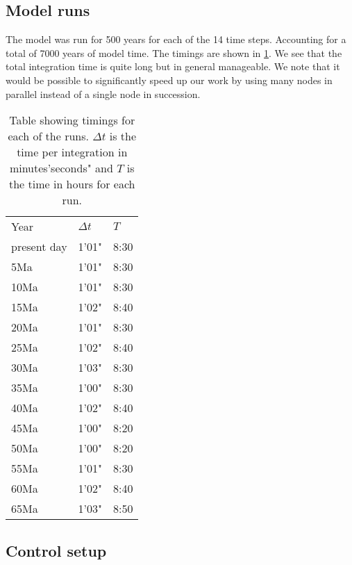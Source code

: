 \subsection{Model runs}
The model was run for 500 years for each of the 14 time steps. Accounting for a total of 7000 years of model time. The timings are shown in \cref{table:masteps}. We see that the total integration time is quite long but in general manageable. We note that it would be possible to significantly speed up our work by using many nodes in parallel instead of a single node in succession.
\begin{table}[H]
	\centering
	\begin{tabular}{lll}
Year & $\Delta t$ & $T$ \\
present day & 1'01" & 8:30 \\
5Ma& 1'01" & 8:30 \\
10Ma & 1'01" & 8:30 \\
15Ma & 1'02" & 8:40 \\
20Ma & 1'01" & 8:30 \\
25Ma & 1'02" & 8:40 \\
30Ma & 1'03" & 8:30 \\
35Ma & 1'00" & 8:30 \\
40Ma & 1'02" & 8:40 \\
45Ma & 1'00" & 8:20 \\
50Ma & 1'00" & 8:20 \\
55Ma & 1'01" & 8:30 \\
60Ma & 1'02" & 8:40 \\
65Ma & 1'03" & 8:50 \\
	\end{tabular}
\caption{Table showing timings for each of the runs. $\Delta t$ is the time per integration in minutes'seconds" and $T$ is the time in hours for each run.}
\label{table:masteps}
\end{table}

\subsection{Control setup}

